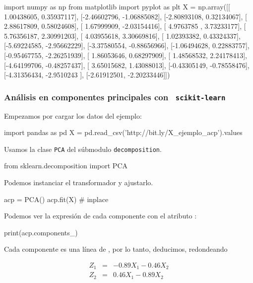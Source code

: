 \documentclass{beamer}
\begin{document}
              \begin{pycode}
import numpy as np
from matplotlib import pyplot as plt
X = np.array([[ 1.00438605,  0.35937117],
       [-2.46602796, -1.06885082],
       [-2.80893108,  0.32134067],
       [ 2.88617809,  0.58024608],
       [ 1.67999909, -2.03154416],
       [ 4.9763785 ,  3.73233177],
       [ 5.76356187,  2.30991203],
       [ 4.03955618,  3.30669816],
       [ 1.02393382,  0.43324337],
       [-5.69224585, -2.95662229],
       [-3.37580554, -0.88656966],
       [-1.06494628,  0.22883757],
       [-0.95467755, -2.26251939],
       [ 1.86053646,  0.68297909],
       [ 1.48568532,  2.24178413],
       [-4.64199706, -0.48257437],
       [ 3.65015682,  1.43088013],
       [-0.43305149, -0.78558476],
       [-4.31356434, -2.9510243 ],
       [-2.61912501, -2.20233446]])
\end{pycode}
\begin{frame}[fragile]
  \frametitle{Análisis en componentes principales con {\tt
      scikit-learn}}
  Empezamos por cargar los datos del ejemplo:
  \begin{pyblock}
import pandas as pd
X = pd.read_csv('http://bit.ly/X_ejemplo_acp').values
\end{pyblock}
\begin{block}{}
    Usamos la clase {\tt PCA} del súbmodulo {\tt decomposition}.
    \begin{pyblock}
from sklearn.decomposition import PCA
    \end{pyblock}
    
  \end{block}
  Podemos instanciar el transformador y  ajustarlo.
  \begin{pyblock}
acp = PCA()
acp.fit(X) # inplace
\end{pyblock}
\end{frame}
\begin{frame}[fragile]
Podemos ver la expresión de cada componente con el
atributo :
\begin{pyblock}
print(acp.components_)
\end{pyblock}
\begin{quote}
\printpythontex[verb]
\end{quote}
Cada componente es una línea de , por lo tanto,
deducimos, redondeando

\begin{eqnarray*}
  Z_1&=&-0.89X_1-0.46X_2\\
Z_2&=&0.46X_1-0.89X_2\\
\end{eqnarray*}

\end{frame}
\end{document}

